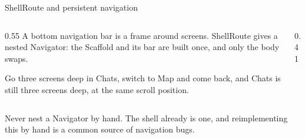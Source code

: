 \documentclass[10pt,aspectratio=169,t]{beamer}
\begin{document}
\begin{frame}[eyebrow=Routing]{ShellRoute and persistent navigation}
  \begin{columns}[T]
    \begin{column}{0.55\textwidth}
      A bottom navigation bar is a frame around screens. ShellRoute gives a nested Navigator: the Scaffold and its bar are built once, and only the body swaps.


      Go three screens deep in Chats, switch to Map and come back, and Chats is still three screens deep, at the same scroll position.
    \end{column}
    \begin{column}{0.41\textwidth}
      \begin{grid}[3]
      \end{grid}
      \vskip 2mm
    \end{column}
  \end{columns}
  \begin{takeaway}{Never nest a Navigator by hand.}
    The shell already is one, and reimplementing this by hand is a common source of navigation bugs.
  \end{takeaway}
\end{frame}
\end{document}
